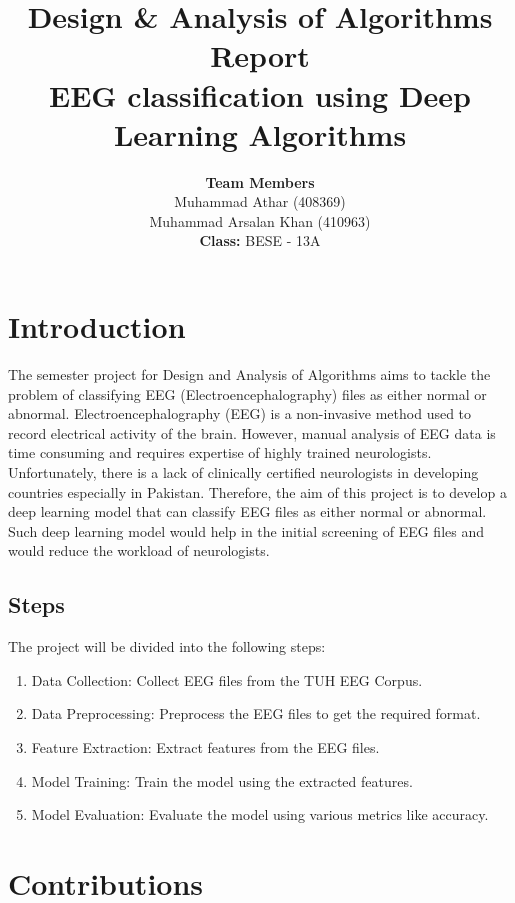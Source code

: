 \documentclass[10pt]{article}
\title{\textbf{Design \& Analysis of Algorithms Report \\ \vspace{5mm} EEG classification using Deep Learning Algorithms}}
\author{\textbf{Team Members} \vspace{1mm} \\ Muhammad Athar (408369) \\ Muhammad Arsalan Khan (410963) \vspace{5mm} \\ \textbf{Class: }BESE - 13A}
\begin{document}
\maketitle

\tableofcontents
\newpage

\justifying
\section{Introduction}
The semester project for Design and Analysis of Algorithms aims to tackle the problem of classifying EEG (Electroencephalography) files as either normal or abnormal.
Electroencephalography (EEG) is a non-invasive method used to record electrical activity of the brain. However, manual analysis of EEG data is time consuming and requires expertise of highly trained neurologists. Unfortunately, there is a lack of clinically certified neurologists in developing countries especially in Pakistan. Therefore, the aim of this project is to develop a deep learning model that can classify EEG files as either normal or abnormal. Such deep learning model would help in the initial screening of EEG files and would reduce the workload of neurologists.

\subsection{Steps}
The project will be divided into the following steps:
\begin{enumerate}
    \item Data Collection: Collect EEG files from the TUH EEG Corpus.
    \item Data Preprocessing: Preprocess the EEG files to get the required format.
    \item Feature Extraction: Extract features from the EEG files.
    \item Model Training: Train the model using the extracted features.
    \item Model Evaluation: Evaluate the model using various metrics like accuracy.
\end{enumerate}

\section{Contributions} 
\end{document}
